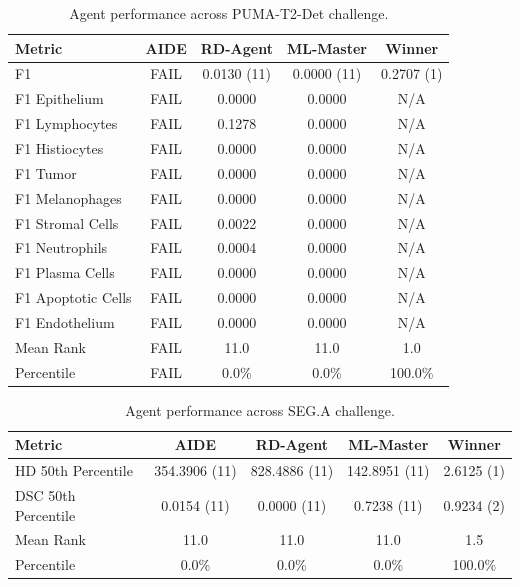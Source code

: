 \begin{table}[htbp]
\centering
\small
\caption{Agent performance across PUMA-T2-Det challenge.}
\vspace{3pt} \label{tab:puma-track2-task2}
\begin{tabular}{lcccc}
\toprule
\textbf{Metric} & \textbf{AIDE} & \textbf{RD-Agent} & \textbf{ML-Master} & \textbf{Winner} \\
\midrule
F1 & FAIL & 0.0130 (11) & 0.0000 (11) & 0.2707 (1) \\
F1 Epithelium & FAIL & 0.0000 & 0.0000 & N/A \\
F1 Lymphocytes & FAIL & 0.1278 & 0.0000 & N/A \\
F1 Histiocytes & FAIL & 0.0000 & 0.0000 & N/A \\
F1 Tumor & FAIL & 0.0000 & 0.0000 & N/A \\
F1 Melanophages & FAIL & 0.0000 & 0.0000 & N/A \\
F1 Stromal Cells & FAIL & 0.0022 & 0.0000 & N/A \\
F1 Neutrophils & FAIL & 0.0004 & 0.0000 & N/A \\
F1 Plasma Cells & FAIL & 0.0000 & 0.0000 & N/A \\
F1 Apoptotic Cells & FAIL & 0.0000 & 0.0000 & N/A \\
F1 Endothelium & FAIL & 0.0000 & 0.0000 & N/A \\
\midrule
Mean Rank & FAIL & 11.0 & 11.0 & 1.0 \\
Percentile & FAIL & 0.0\% & 0.0\% & 100.0\% \\
\bottomrule
\end{tabular}
\end{table}

\begin{table}[htbp]
\centering
\small
\caption{Agent performance across SEG.A challenge.}
\vspace{3pt} \label{tab:seg_a}
\begin{tabular}{lcccc}
\toprule
\textbf{Metric} & \textbf{AIDE} & \textbf{RD-Agent} & \textbf{ML-Master} & \textbf{Winner} \\
\midrule
HD 50th Percentile & 354.3906 (11) & 828.4886 (11) & 142.8951 (11) & 2.6125 (1) \\
DSC 50th Percentile & 0.0154 (11) & 0.0000 (11) & 0.7238 (11) & 0.9234 (2) \\
\midrule
Mean Rank & 11.0 & 11.0 & 11.0 & 1.5 \\
Percentile & 0.0\% & 0.0\% & 0.0\% & 100.0\% \\
\bottomrule
\end{tabular}
\end{table}

